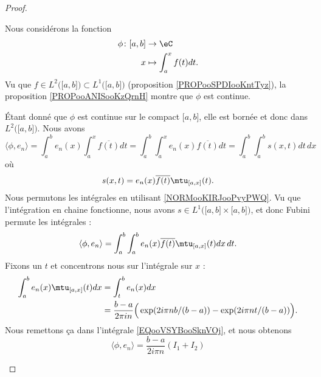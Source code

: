 \begin{proof}
\begin{subproof}
		Nous considérons la fonction
		\begin{equation}
			\begin{aligned}
				\phi\colon \mathopen[ a,b\mathclose] & \to \eC                 \\
				x                                    & \mapsto \int_a^xf(t)dt.
			\end{aligned}
		\end{equation}
		Vu que \( f\in L^2\big( \mathopen[ a,b\mathclose] \big)\subset L^1\big( \mathopen[ a,b\mathclose] \big)\) (proposition \ref{PROPooSPDIooKntTyz}), la proposition \ref{PROPooANISooKzQrnH} montre que \( \phi\) est continue.

		Étant donné que \( \phi\) est continue sur le compact \( \mathopen[ a,b\mathclose]\), elle est bornée et donc dans \( L^2\big( \mathopen[ a,b\mathclose] \big)\). Nous avons
		\begin{equation}
			\langle \phi, e_n \rangle  =\int_a^be_n(x)\int_a^x\overline{f(t)}dt
			=\int_{a}^b\int_a^xe_n(x)\overline{f(t)}dt
			=\int_a^b\int_a^bs(x,t)dt\,dx
		\end{equation}
		où
		\begin{equation}
			s(x,t)=e_n(x)\overline{f(t)}\mtu_{\mathopen[ a,x\mathclose]}(t).
		\end{equation}
		Nous permutons les intégrales en utilisant \ref{NORMooKIRJooPvyPWQ}. Vu que l'intégration en chaine fonctionne, nous avons \( s\in L^1\big( \mathopen[ a,b\mathclose]\times \mathopen[ a,b\mathclose] \big)\), et donc Fubini permute les intégrales :
		\begin{equation}		\label{EQooVSYBooSknVOj}
			\langle \phi, e_n \rangle=\int_a^b\int_a^be_n(x)\overline{f(t)}\mtu_{\mathopen[ a,x\mathclose]}(t)dx\,dt.
		\end{equation}
		Fixons un \( t\) et concentrons nous sur l'intégrale sur \( x\) :
		\begin{subequations}
			\begin{align}
				\int_a^be_n(x)\mtu_{\mathopen[ a,x\mathclose]}(t)dx & =\int_t^be_n(x)dx                                                               \\
				                                                    & =\frac{ b-a }{ 2\pi i n }\Big( \exp(2i\pi nb/(b-a))-\exp(2i\pi nt/(b-a)) \Big).
			\end{align}
		\end{subequations}
		Nous remettons ça dans l'intégrale \eqref{EQooVSYBooSknVOj}, et nous obtenons
		\begin{equation}
			\langle \phi, e_n \rangle=\frac{ b-a }{ 2i\pi n }(I_1+I_2)

\end{equation}
\end{subproof}
\end{proof}
